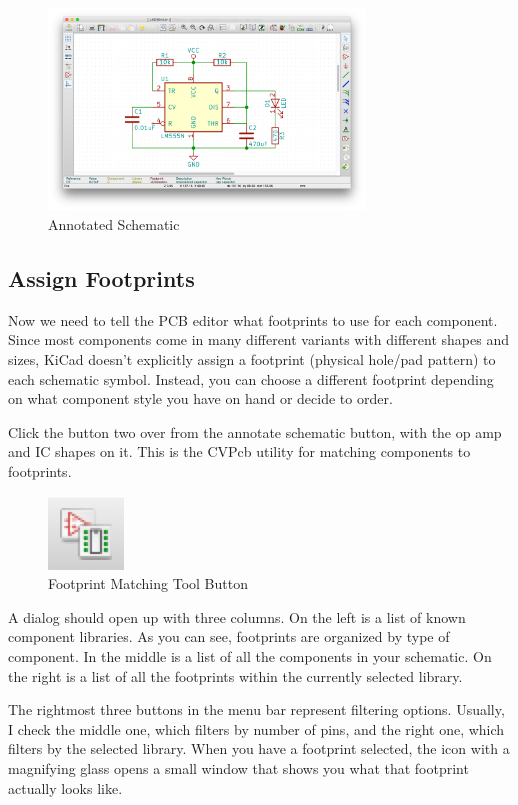 \documentclass[12pt, oneside]{article}
\begin{document}
\begin{figure}[H]
\includegraphics[width=0.75\textwidth]{SchematicAnnotated}
\centering
\caption{Annotated Schematic}
\end{figure}

\subsection{Assign Footprints}
Now we need to tell the PCB editor what footprints to use for each component. Since most components come in many different variants with different shapes and sizes, KiCad doesn't explicitly assign a footprint (physical hole/pad pattern) to each schematic symbol. Instead, you can choose a different footprint depending on what component style you have on hand or decide to order. 

Click the button two over from the annotate schematic button, with the op amp and IC shapes on it. This is the CVPcb utility for matching components to footprints.

\begin{figure}[H]
\includegraphics{CVPcbButton}
\centering
\caption{Footprint Matching Tool Button}
\end{figure}

A dialog should open up with three columns. On the left is a list of known component libraries. As you can see, footprints are organized by type of component. In the middle is a list of all the components in your schematic. On the right is a list of all the footprints within the currently selected library. 

The rightmost three buttons in the menu bar represent filtering options. Usually, I check the middle one, which filters by number of pins, and the right one, which filters by the selected library. When you have a footprint selected, the icon with a magnifying glass opens a small window that shows you what that footprint actually looks like.
\end{document}
